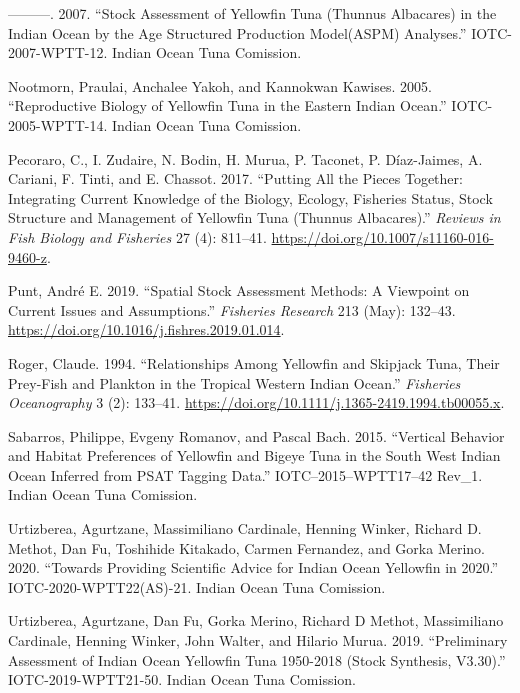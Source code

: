 \documentclass[
]{scrartcl}
\newlength{\cslhangindent}
\newenvironment{CSLReferences}[2] %
 {\begin{list}{}{%
  \setlength{\itemindent}{0pt}
  \setlength{\leftmargin}{0pt}
  \setlength{\parsep}{0pt}
  \ifodd #1
   \setlength{\leftmargin}{\cslhangindent}
   \setlength{\itemindent}{-1\cslhangindent}
  \fi
  \setlength{\itemsep}{#2\baselineskip}}}
 {\end{list}}
\begin{document}
\begin{CSLReferences}{1}{0}
---------. 2007. {``Stock Assessment of Yellowfin Tuna ({Thunnus}
Albacares) in the {Indian Ocean} by the Age Structured Production
Model({ASPM}) Analyses.''} IOTC-2007-WPTT-12. Indian Ocean Tuna
Comission.

Nootmorn, Praulai, Anchalee Yakoh, and Kannokwan Kawises. 2005.
{``Reproductive Biology of Yellowfin Tuna in the Eastern {Indian
Ocean}.''} IOTC-2005-WPTT-14. Indian Ocean Tuna Comission.

Pecoraro, C., I. Zudaire, N. Bodin, H. Murua, P. Taconet, P.
Díaz-Jaimes, A. Cariani, F. Tinti, and E. Chassot. 2017. {``Putting All
the Pieces Together: Integrating Current Knowledge of the Biology,
Ecology, Fisheries Status, Stock Structure and Management of Yellowfin
Tuna ({Thunnus} Albacares).''} \emph{Reviews in Fish Biology and
Fisheries} 27 (4): 811--41.
\url{https://doi.org/10.1007/s11160-016-9460-z}.

Punt, André E. 2019. {``Spatial Stock Assessment Methods: {A} Viewpoint
on Current Issues and Assumptions.''} \emph{Fisheries Research} 213
(May): 132--43. \url{https://doi.org/10.1016/j.fishres.2019.01.014}.

Roger, Claude. 1994. {``Relationships Among Yellowfin and Skipjack Tuna,
Their Prey-Fish and Plankton in the Tropical Western {Indian Ocean}.''}
\emph{Fisheries Oceanography} 3 (2): 133--41.
\url{https://doi.org/10.1111/j.1365-2419.1994.tb00055.x}.

Sabarros, Philippe, Evgeny Romanov, and Pascal Bach. 2015. {``Vertical
Behavior and Habitat Preferences of Yellowfin and Bigeye Tuna in the
{South West Indian Ocean} Inferred from {PSAT} Tagging Data.''}
IOTC--2015--WPTT17--42 Rev\_1. Indian Ocean Tuna Comission.

Urtizberea, Agurtzane, Massimiliano Cardinale, Henning Winker, Richard
D. Methot, Dan Fu, Toshihide Kitakado, Carmen Fernandez, and Gorka
Merino. 2020. {``Towards Providing Scientific Advice for {Indian Ocean}
Yellowfin in 2020.''} IOTC-2020-WPTT22(AS)-21. Indian Ocean Tuna
Comission.

Urtizberea, Agurtzane, Dan Fu, Gorka Merino, Richard D Methot,
Massimiliano Cardinale, Henning Winker, John Walter, and Hilario Murua.
2019. {``Preliminary Assessment of {Indian Ocean} Yellowfin Tuna
1950-2018 ({Stock Synthesis}, V3.30).''} IOTC-2019-WPTT21-50. Indian
Ocean Tuna Comission.


\end{CSLReferences}
\end{document}
